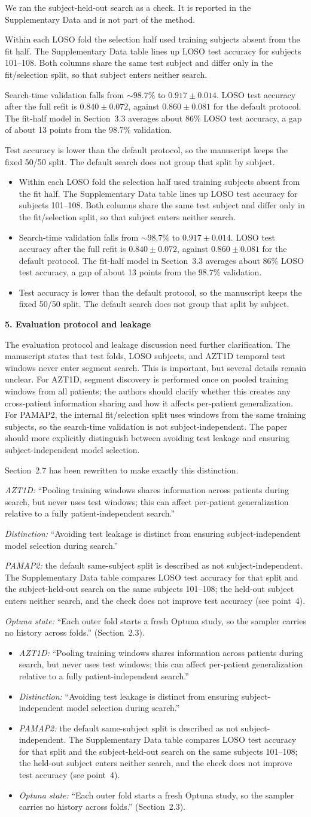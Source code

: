\documentclass[11pt]{article}
\makeatletter
\newcommand{\rsp}{\par\vspace{0.9em}}
\newcommand{\rcitem}[2]{\begin{reviewerbox}\textbf{#1}\par\smallskip#2\end{reviewerbox}}
\newcommand{\response}[2]{%
  \begin{responsebox}#1%
  \def\@responseitems{#2}%
  \ifx\@responseitems\empty\else\begin{itemize}[nosep,leftmargin=1.2em]#2\end{itemize}\fi
  \end{responsebox}\rsp}
\makeatother
\begin{document}
\response{We ran the subject-held-out search as a check. It is reported in the Supplementary Data
and is not part of the method.}{
  \item Within each LOSO fold the selection half used training subjects absent from the fit half.
    The Supplementary Data table lines up LOSO test accuracy for subjects 101--108. Both columns
    share the same test subject and differ only in the fit/selection split, so that subject enters
    neither search.
  \item Search-time validation falls from ${\sim}98.7\%$ to $0.917\pm0.014$. LOSO test accuracy
    after the full refit is $0.840\pm0.072$, against $0.860\pm0.081$ for the default protocol.
    The fit-half model in Section~3.3 averages about $86\%$ LOSO test accuracy, a gap of about
    13 points from the $98.7\%$ validation.
  \item Test accuracy is lower than the default protocol, so the manuscript keeps the fixed 50/50
    split. The default search does not group that split by subject.
}

\rcitem{5. Evaluation protocol and leakage}{The evaluation protocol and leakage discussion need further
clarification. The manuscript states that test folds, LOSO subjects, and AZT1D temporal test windows
never enter segment search. This is important, but several details remain unclear. For AZT1D, segment
discovery is performed once on pooled training windows from all patients; the authors should clarify
whether this creates any cross-patient information sharing and how it affects per-patient
generalization. For PAMAP2, the internal fit/selection split uses windows from the same training
subjects, so the search-time validation is not subject-independent. The paper should more explicitly
distinguish between avoiding test leakage and ensuring subject-independent model selection.}

\response{Section~2.7 has been rewritten to make exactly this distinction.}{
  \item \emph{AZT1D:} ``Pooling training windows shares information across patients during search,
    but never uses test windows; this can affect per-patient generalization relative to a fully
    patient-independent search.''
  \item \emph{Distinction:} ``Avoiding test leakage is distinct from ensuring subject-independent
    model selection during search.''
  \item \emph{PAMAP2:} the default same-subject split is described as not subject-independent.
    The Supplementary Data table compares LOSO test accuracy for that split and the subject-held-out
    search on the same subjects 101--108; the held-out subject enters neither search, and the check
    does not improve test accuracy (see point~4).
  \item \emph{Optuna state:} ``Each outer fold starts a fresh Optuna study, so the sampler carries no
    history across folds.'' (Section~2.3).
}
\end{document}
